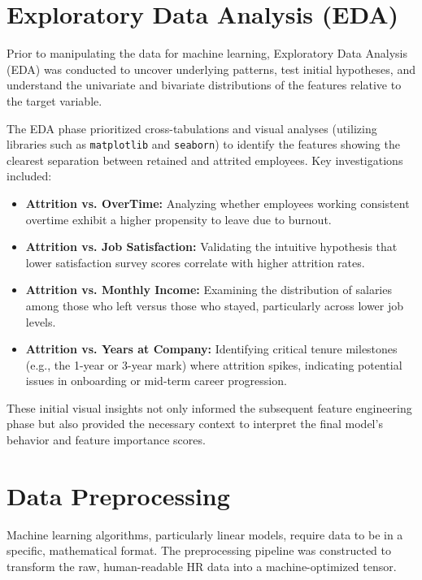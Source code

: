 \section{Exploratory Data Analysis (EDA)}
Prior to manipulating the data for machine learning, Exploratory Data Analysis (EDA) was conducted to uncover underlying patterns, test initial hypotheses, and understand the univariate and bivariate distributions of the features relative to the target variable.

The EDA phase prioritized cross-tabulations and visual analyses (utilizing libraries such as \texttt{matplotlib} and \texttt{seaborn}) to identify the features showing the clearest separation between retained and attrited employees. Key investigations included:
\begin{itemize}
    \item \textbf{Attrition vs. OverTime:} Analyzing whether employees working consistent overtime exhibit a higher propensity to leave due to burnout.
    \item \textbf{Attrition vs. Job Satisfaction:} Validating the intuitive hypothesis that lower satisfaction survey scores correlate with higher attrition rates.
    \item \textbf{Attrition vs. Monthly Income:} Examining the distribution of salaries among those who left versus those who stayed, particularly across lower job levels.
    \item \textbf{Attrition vs. Years at Company:} Identifying critical tenure milestones (e.g., the 1-year or 3-year mark) where attrition spikes, indicating potential issues in onboarding or mid-term career progression.
\end{itemize}
These initial visual insights not only informed the subsequent feature engineering phase but also provided the necessary context to interpret the final model's behavior and feature importance scores.

\section{Data Preprocessing}
Machine learning algorithms, particularly linear models, require data to be in a specific, mathematical format. The preprocessing pipeline was constructed to transform the raw, human-readable HR data into a machine-optimized tensor.

